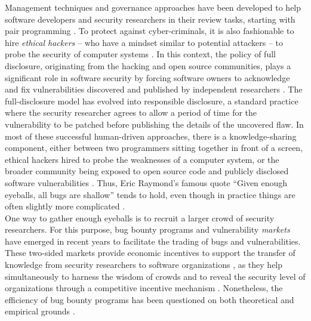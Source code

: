 Management techniques and governance approaches have been developed to help software developers and security researchers in their review tasks, starting with pair programming \cite{hulkko2005multiple}. To protect against cyber-criminals, it is also fashionable to hire {\it ethical hackers} -- who have a mindset similar to potential attackers -- to probe the security of computer systems \cite{smith2002ethical,saleem2006ethical,bishop2007penetration}. In this context, the policy of full disclosure, originating from the hacking and open source communities, plays a significant role in software security by forcing software owners to acknowledge and fix vulnerabilities discovered and published by independent researchers \cite{arora2008optimal}. The full-disclosure model has evolved into responsible disclosure, a standard practice where the security researcher agrees to allow a period of time for the vulnerability to be patched before publishing the details of the uncovered flaw. In most of these successful human-driven approaches, there is a knowledge-sharing component, either between two programmers sitting together in front of a screen, ethical hackers hired to probe the weaknesses of a computer system, or the broader community being exposed to open source code and publicly disclosed software vulnerabilities \cite{cavusoglu2007efficiency}. Thus, Eric Raymond's famous quote ``Given enough eyeballs, all bugs are shallow'' \cite{raymond1999cathedral} tends to hold, even though in practice things are often slightly more complicated \cite{hafiz2015game}.\\

One way to gather enough eyeballs is to recruit a larger crowd of security researchers. For this purpose, bug bounty programs and vulnerability {\it markets} have emerged in recent years to facilitate the trading of bugs and vulnerabilities. These two-sided markets provide economic incentives to support the transfer of knowledge from security researchers to software organizations \cite{camp2004pricing}, as they help simultaneously to harness the wisdom of crowds and to reveal the security level of organizations through a competitive incentive mechanism \cite{schechter2002buy}. Nonetheless, the efficiency of bug bounty programs has been questioned on both theoretical \cite{kannan2005market,mckinney2007vulnerability} and empirical grounds \cite{ransbotham2008markets,algarni2014software}.\\

